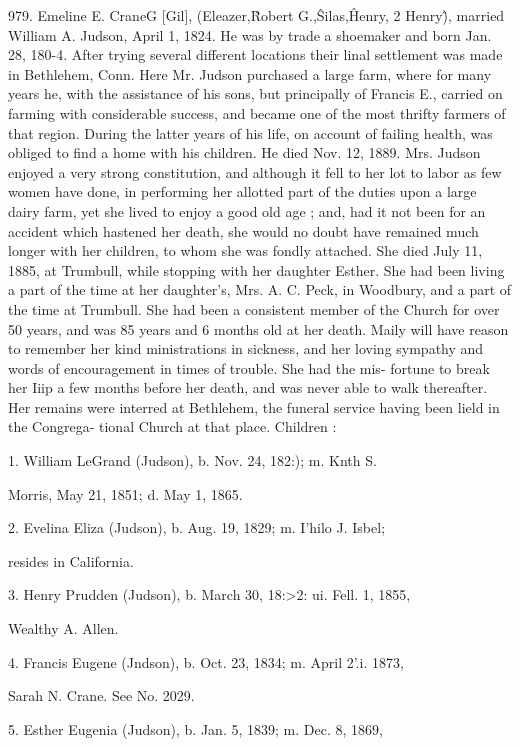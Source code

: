 \documentclass{book}
\begin{document}
979. Emeline E. CraneG [Gil], (Eleazer,\^ Robert G.,\^ Silas,\^ 
Henry, 2 Henry\^), married William A. Judson, April 1, 1824. 
He was by trade a shoemaker and born Jan. 28, 180-4. After 
trying several different locations their linal settlement was made 
in Bethlehem, Conn. Here Mr. Judson purchased a large farm, 
where for many years he, with the assistance of his sons, but 
principally of Francis E., carried on farming with considerable 
success, and became one of the most thrifty farmers of that 
region. During the latter years of his life, on account of failing 
health, was obliged to find a home with his children. He died 
Nov. 12, 1889. Mrs. Judson enjoyed a very strong constitution, 
and although it fell to her lot to labor as few women have done, 
in performing her allotted part of the duties upon a large dairy 
farm, yet she lived to enjoy a good old age ; and, had it not been 
for an accident which hastened her death, she would no doubt 
have remained much longer with her children, to whom she was 
fondly attached. She died July 11, 1885, at Trumbull, while 
stopping with her daughter Esther. She had been living a part 
of the time at her daughter's, Mrs. A. C. Peck, in Woodbury, 
and a part of the time at Trumbull. She had been a consistent 
member of the Church for over 50 years, and was 85 years and 
6 months old at her death. Maily will have reason to remember 
her kind ministrations in sickness, and her loving sympathy and 
words of encouragement in times of trouble. She had the mis- 
fortune to break her Iiip a few months before her death, and was 
never able to walk thereafter. Her remains were interred at 
Bethlehem, the funeral service having been lield in the Congrega- 
tional Church at that place. Children : 

1. William LeGrand (Judson), b. Nov. 24, 182:); m. Knth S. 

Morris, May 21, 1851; d. May 1, 1865. 

2. Evelina Eliza (Judson), b. Aug. 19, 1829; m. I'hilo J. Isbel; 

resides in California. 

3. Henry Prudden (Judson), b. March 30, 18:>2: ui. Fell. 1, 1855, 

Wealthy A. Allen. 

4. Francis Eugene (Jndson), b. Oct. 23, 1834; m. April 2'.i. 1873, 

Sarah N. Crane. See No. 2029. 

5. Esther Eugenia (Judson), b. Jan. 5, 1839; m. Dec. 8, 1869, 
\end{document}
